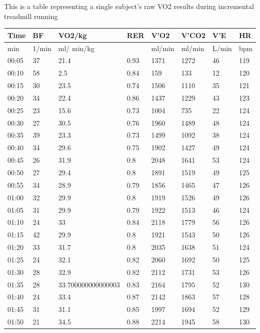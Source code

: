 \documentclass[
]{book}
\begin{document}
This is a table representing a single subject's raw VO2 results during incremental treadmill running

\begin{tabular}{l|l|l|l|l|l|l|l}
\hline
Time & BF & VO2/kg & RER & V'O2 & V'CO2 & V'E & HR\\
\hline
min & 1/min & ml/ min/kg &  & ml/min & ml/min & L/min & bpm\\
\hline
00:05 & 37 & 21.4 & 0.93 & 1371 & 1272 & 46 & 119\\
\hline
00:10 & 58 & 2.5 & 0.84 & 159 & 133 & 12 & 120\\
\hline
00:15 & 30 & 23.5 & 0.74 & 1506 & 1110 & 35 & 121\\
\hline
00:20 & 34 & 22.4 & 0.86 & 1437 & 1229 & 43 & 123\\
\hline
00:25 & 23 & 15.6 & 0.73 & 1004 & 735 & 22 & 124\\
\hline
00:30 & 27 & 30.5 & 0.76 & 1960 & 1489 & 48 & 124\\
\hline
00:35 & 39 & 23.3 & 0.73 & 1499 & 1092 & 38 & 124\\
\hline
00:40 & 34 & 29.6 & 0.75 & 1902 & 1427 & 49 & 124\\
\hline
00:45 & 26 & 31.9 & 0.8 & 2048 & 1641 & 53 & 124\\
\hline
00:50 & 27 & 29.4 & 0.8 & 1891 & 1519 & 49 & 125\\
\hline
00:55 & 34 & 28.9 & 0.79 & 1856 & 1465 & 47 & 126\\
\hline
01:00 & 32 & 29.9 & 0.8 & 1919 & 1526 & 49 & 126\\
\hline
01:05 & 31 & 29.9 & 0.79 & 1922 & 1513 & 46 & 124\\
\hline
01:10 & 24 & 33 & 0.84 & 2118 & 1779 & 56 & 126\\
\hline
01:15 & 42 & 29.9 & 0.8 & 1921 & 1543 & 50 & 126\\
\hline
01:20 & 33 & 31.7 & 0.8 & 2035 & 1638 & 51 & 124\\
\hline
01:25 & 24 & 32.1 & 0.82 & 2060 & 1692 & 50 & 125\\
\hline
01:30 & 28 & 32.9 & 0.82 & 2112 & 1731 & 53 & 126\\
\hline
01:35 & 28 & 33.700000000000003 & 0.83 & 2164 & 1795 & 52 & 130\\
\hline
01:40 & 24 & 33.4 & 0.87 & 2142 & 1863 & 57 & 128\\
\hline
01:45 & 31 & 31.1 & 0.85 & 1997 & 1694 & 52 & 129\\
\hline
01:50 & 21 & 34.5 & 0.88 & 2214 & 1945 & 58 & 130\\

\end{tabular}
\end{document}
